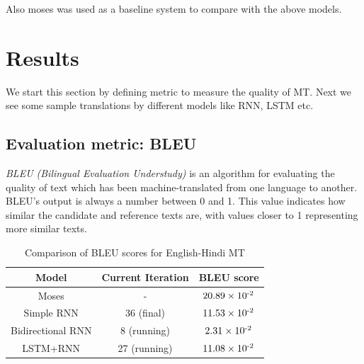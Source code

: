 \documentclass[12pt]{report}
\begin{document}
Also moses was used as a baseline system to compare with the above models.



\chapter{Results}
We start this section by defining metric to measure the quality of MT. Next we see some sample translations by different models like RNN, LSTM etc.

\section{Evaluation metric: BLEU}\label{sec:metric}
\emph{BLEU (Bilingual Evaluation Understudy)} is an algorithm for evaluating the quality of text which has been machine-translated from one language to another. BLEU’s output is always a number between 0 and 1. This value indicates how similar the candidate and reference texts are, with values closer to 1 representing more similar texts.

 \begin{table}[t]
 \begin{center}
  \begin{tabular}{|c|c|c|}
    \hline
            \textbf{Model} & \textbf{Current Iteration} & \textbf{BLEU score} \\ \hline
 Moses & -  & $20.89 \times 10\textsuperscript{-2}$  \\ \hline
 Simple RNN &  36 (final)   & $11.53 \times 10\textsuperscript{-2}$  \\ \hline
Bidirectional RNN  &  8 (running)   & $2.31 \times 10\textsuperscript{-2}$  \\ \hline
LSTM+RNN  &  27 (running)   & $11.08 \times 10\textsuperscript{-2}$  \\\hline
   \end{tabular}
  \caption{Comparison of BLEU scores for English-Hindi MT}
  \vspace{-0.4cm}
  \label{table1}
\end{center}
\end{table}
\end{document}
